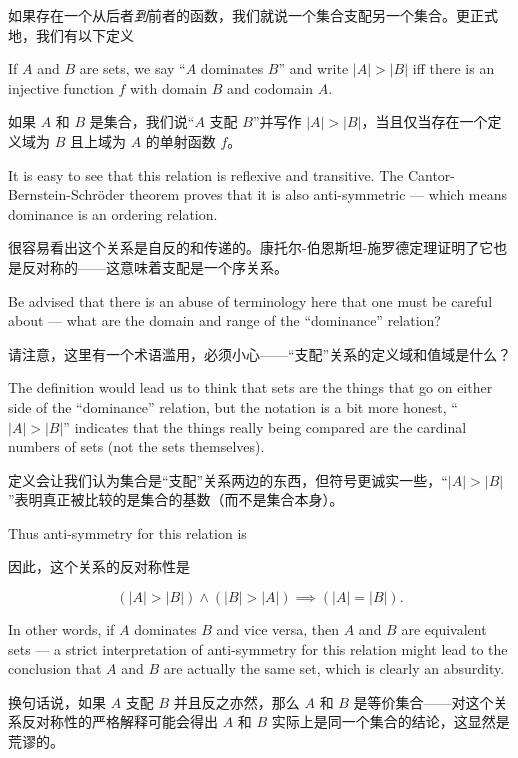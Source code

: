 如果存在一个从后者\emph{到}前者的函数，我们就说一个集合支配另一个集合。更正式地，我们有以下定义

\begin{defi}  If $A$ and $B$ are sets, we say ``$A$
    dominates $B$''
    and write $|A| > |B|$ iff there is an injective function $f$ with
    domain $B$ and codomain $A$.
\end{defi}

\begin{defi}  如果 $A$ 和 $B$ 是集合，我们说“$A$ 支配 $B$”并写作 $|A| > |B|$，当且仅当存在一个定义域为 $B$ 且上域为 $A$ 的单射函数 $f$。
\end{defi}

It is easy to see that this relation is reflexive and transitive.  The Cantor-
Bernstein-Schr\"{o}der theorem proves that it is also anti-symmetric --- which
means dominance is an ordering relation.

很容易看出这个关系是自反的和传递的。康托尔-伯恩斯坦-施罗德定理证明了它也是反对称的——这意味着支配是一个序关系。

Be advised that there is an abuse
of terminology here that one must be careful about --- what are the domain
and range of the ``dominance'' relation?

请注意，这里有一个术语滥用，必须小心——“支配”关系的定义域和值域是什么？

The definition would lead us to
think that sets are the things that go on either side of the ``dominance''
relation, but the notation is a bit more honest, ``$|A|
    > |B|$''
indicates that the
things really being compared are the cardinal numbers of sets (not the sets
themselves).

定义会让我们认为集合是“支配”关系两边的东西，但符号更诚实一些，“$|A| > |B|$”表明真正被比较的是集合的基数（而不是集合本身）。

Thus anti-symmetry for this relation is

因此，这个关系的反对称性是

\[ (|A| > |B|) \land (|B| > |A|) \implies (|A| = |B|).
\]

In other words, if $A$ dominates $B$ and vice versa, then $A$ and $B$ are
equivalent sets --- a strict interpretation of anti-symmetry for this relation
might lead to the conclusion that $A$ and $B$ are actually the same set, which
is clearly an absurdity.

换句话说，如果 $A$ 支配 $B$ 并且反之亦然，那么 $A$ 和 $B$ 是等价集合——对这个关系反对称性的严格解释可能会得出 $A$ 和 $B$ 实际上是同一个集合的结论，这显然是荒谬的。

